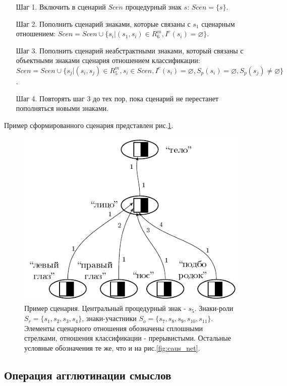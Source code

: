 \documentclass[12pt]{scrartcl}
\begin{document}
	\begin{itemize}
		\item[Шаг 1.] Включить в сценарий $Scen$ процедурный знак $s$: $Scen=\{s\}$.
		\item[Шаг 2.] Пополнить сценарий знаками, которые связаны с $s_1$ сценарным отношением: $Scen=Scen\cup\{s_i|(s_1,s_i)\in R_6^m, I^e(s_i)=\varnothing\}$.
		\item[Шаг 3.] Пополнить сценарий неабстрактными знаками, который связаны с объектными знаками сценария отношением классификации: $Scen=Scen\cup\{s_j|(s_i,s_j)\in R_5^m, s_i\in Scen, I^e(s_i)=\varnothing, S_p(s_i)=\varnothing, S_p(s_j)\not=\varnothing\}$.
		\item[Шаг 4.] Повторять шаг 3 до тех пор, пока сценарий не перестанет пополняться новыми знаками.
	\end{itemize}
	
	Пример сформированного сценария представлен рис.\ref{fig:scenarion}.
	
	\begin{figure}[h]
		\centering
		\includegraphics[width=\textwidth,page=4]{examples/causnet/caus_net}
		\caption{Пример сценария. Центральный процедурный знак - $s_5$. Знаки-роли $S_r=\{s_1,s_2,s_3,s_4\}$, знаки-участники $S_o=\{s_7,s_8,s_9,s_{10},s_{11}\}$. Элементы сценарного отношения обозначены сплошными стрелками, отношения классификации - прерывистыми. Остальные условные обозначения те же, что и на рис.\ref{fig:caus_net}.}
		\label{fig:scenarion}		
	\end{figure}

		
	\subsection{Операция агглютинации смыслов}
	
\end{document}
